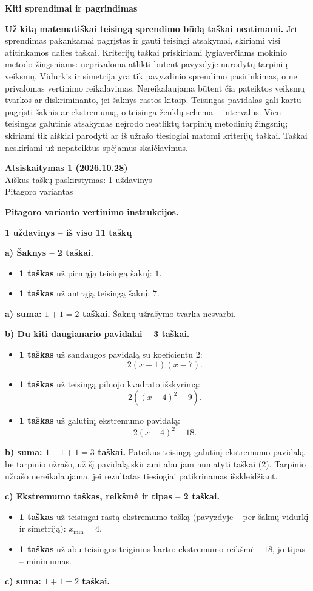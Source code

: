 \documentclass[11pt]{article}
\newcommand{\antraste}[1]{\begin{center}\Large\textbf{Atsiskaitymas 1 (2026.10.28)}\\\large #1\\\normalsize Pitagoro variantas\end{center}}
\newcommand{\sk}[1]{\par\medskip\textbf{#1}\par}
\begin{document}
\sk{Kiti sprendimai ir pagrindimas}
\textbf{Už kitą matematiškai teisingą sprendimo būdą taškai neatimami.} Jei sprendimas pakankamai pagrįstas ir gauti teisingi atsakymai, skiriami visi atitinkamos dalies taškai. Kriterijų taškai priskiriami lygiaverčiams mokinio metodo žingsniams: neprivaloma atlikti būtent pavyzdyje nurodytų tarpinių veiksmų. Vidurkis ir simetrija yra tik pavyzdinio sprendimo pasirinkimas, o ne privalomas vertinimo reikalavimas. Nereikalaujama būtent čia pateiktos veiksmų tvarkos ar diskriminanto, jei šaknys rastos kitaip. Teisingas pavidalas gali kartu pagrįsti šaknis ar ekstremumą, o teisinga ženklų schema -- intervalus. Vien teisingas galutinis atsakymas neįrodo neatliktų tarpinių metodinių žingsnių; skiriami tik aiškiai parodyti ar iš užrašo tiesiogiai matomi kriterijų taškai. Taškai neskiriami už nepateiktus spėjamus skaičiavimus.
\normalsize\newpage
\antraste{Aiškus taškų paskirstymas: 1 uždavinys}
\textbf{Pitagoro varianto vertinimo instrukcijos.}
\sk{1 uždavinys -- iš viso 11 taškų}
\textbf{a) Šaknys -- 2 taškai.}
\begin{itemize}
\item \textbf{1 taškas} už pirmąją teisingą šaknį: $1$.
\item \textbf{1 taškas} už antrąją teisingą šaknį: $7$.
\end{itemize}
\textbf{a) suma: $1+1=2$ taškai.} Šaknų užrašymo tvarka nesvarbi.

\textbf{b) Du kiti daugianario pavidalai -- 3 taškai.}
\begin{itemize}
\item \textbf{1 taškas} už sandaugos pavidalą su koeficientu $2$:
\[2(x-1)(x-7).\]
\item \textbf{1 taškas} už teisingą pilnojo kvadrato išskyrimą:
\[2((x-4)^2-9).\]
\item \textbf{1 taškas} už galutinį ekstremumo pavidalą:
\[2(x-4)^2-18.\]
\end{itemize}
\textbf{b) suma: $1+1+1=3$ taškai.} Pateikus teisingą galutinį ekstremumo pavidalą be tarpinio užrašo, už šį pavidalą skiriami abu jam numatyti taškai (2). Tarpinio užrašo nereikalaujama, jei rezultatas tiesiogiai patikrinamas išskleidžiant.

\textbf{c) Ekstremumo taškas, reikšmė ir tipas -- 2 taškai.}
\begin{itemize}
\item \textbf{1 taškas} už teisingai rastą ekstremumo tašką (pavyzdyje -- per šaknų vidurkį ir simetriją): $x_{\min}=4$.
\item \textbf{1 taškas} už abu teisingus teiginius kartu: ekstremumo reikšmė $-18$, jo tipas -- minimumas.
\end{itemize}
\textbf{c) suma: $1+1=2$ taškai.}
\end{document}
